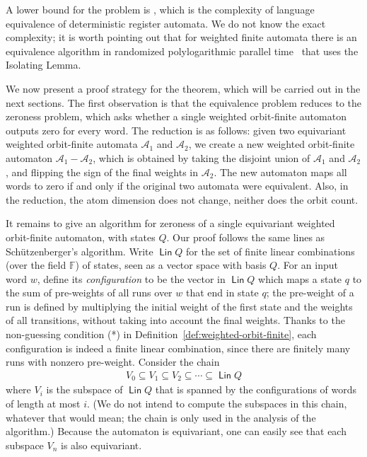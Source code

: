 \documentclass[10pt,a4paper]{amsart}
\numberwithin{equation}{section}
\newcommand{\Aa}{{\mathcal A}}
\DeclareMathOperator{\lin}{\mathsf{Lin}}
\newcommand{\field}{\mathbb F}
\newcommand{\schutz}{Sch\"utzenberger\xspace}
\newcommand{\pspace}{{\sc{PSpace}}\xspace }
\begin{document}
A lower bound for the problem is \pspace, which is the complexity of language equivalence of deterministic register automata. We do not know the exact complexity; it is worth pointing out that for weighted finite automata there is an equivalence algorithm in randomized polylogarithmic parallel time~\cite[Sec.~3.2]{kiefer2013} that uses the Isolating Lemma.

We now present a proof strategy for the theorem, which will be carried out in the next sections.  The first observation is that the equivalence problem reduces to the zeroness problem, which asks whether a single weighted orbit-finite automaton outputs zero for every  word. The reduction is as follows: given two equivariant weighted orbit-finite automata $\Aa_1$ and $\Aa_2$, we create a new weighted orbit-finite automaton $\Aa_1 - \Aa_2$, which is obtained by taking the disjoint union of $\Aa_1$ and $\Aa_2$, and flipping the  sign of the final weights in $\Aa_2$. The new automaton maps all  words to zero if and only if the original two automata were equivalent. Also, in the reduction, the atom dimension does not change, neither does the orbit count.


It remains to give an algorithm for zeroness of a single equivariant  weighted orbit-finite automaton, with states $Q$. Our proof follows the same lines as \schutz's algorithm. Write $\lin Q$ for the set of  finite linear combinations (over the field $\field$) of states, seen as a vector space with basis $Q$.  For an input   word $w$, define its \emph{configuration} to be the vector in $\lin Q$
which maps a state $q$ to the sum of pre-weights of all runs over $w$ that end in state $q$; the pre-weight of a run is defined by multiplying the initial weight of the first state and the weights of all transitions, without taking into account the final weights. Thanks to the non-guessing condition (*) in Definition~\ref{def:weighted-orbit-finite}, each configuration is indeed a finite linear combination, since there are finitely many runs with nonzero pre-weight.  Consider  the  chain
\begin{align*}
V_0 \subseteq V_1 \subseteq V_2 \subseteq \cdots \subseteq \lin Q
\end{align*}
where $V_i$ is the  subspace of $\lin Q$ that is spanned by the configurations of   words of length at most  $i$. (We do not intend to compute the subspaces in this chain, whatever that would mean;  the chain is only used in the analysis of the algorithm.) Because the automaton is equivariant, one can easily see that each subspace $V_n$ is also equivariant. 
\end{document}
